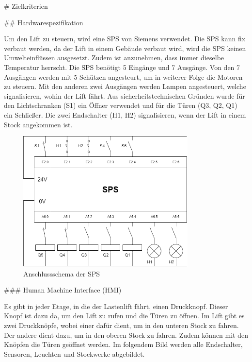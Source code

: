 \begin{markdown}
# Zielkriterien

## Hardwarespezifikation

Um den Lift zu steuern, wird eine SPS von Siemens verwendet. Die SPS kann fix verbaut werden, da der Lift in einem Gebäude verbaut wird, wird die SPS keinen Umwelteinflüssen ausgesetzt. Zudem ist anzunehmen, dass immer dieselbe Temperatur herrscht. Die SPS benötigt 5 Eingänge und 7 Ausgänge. Von den 7 Ausgängen werden mit 5 Schützen angesteurt, um in weiterer Folge die Motoren zu steuern. Mit den anderen zwei Ausgängen werden Lampen angesteuert, welche signalisieren, wohin der Lift fährt. Aus sicherheitstechnischen Gründen wurde für den Lichtschranken (S1) ein Öffner verwendet und für die Türen (Q3, Q2, Q1) ein Schließer. Die zwei Endschalter (H1, H2) signalisieren, wenn der Lift in einem Stock angekommen ist.

\begin{figure}[H]
    \centering
    \includegraphics[width=0.8\textwidth]{./images/Anschlussschema.png}
    \caption[Anschlussschema der SPS]{Anschlussschema der SPS}
\end{figure}

### Human Machine Interface (HMI)

Es gibt in jeder Etage, in die der Lastenlift fährt, einen Druckknopf. Dieser Knopf ist dazu da, um den Lift zu rufen und die Türen zu öffnen. Im Lift gibt es zwei Druckknöpfe, wobei einer dafür dient, um in den unteren Stock zu fahren. Der andere dient dazu, um in den oberen Stock zu fahren. Zudem können mit den Knöpfen die Türen geöffnet werden. Im folgendem Bild werden alle Endschalter, Sensoren, Leuchten und Stockwerke abgebildet.


\end{markdown}
